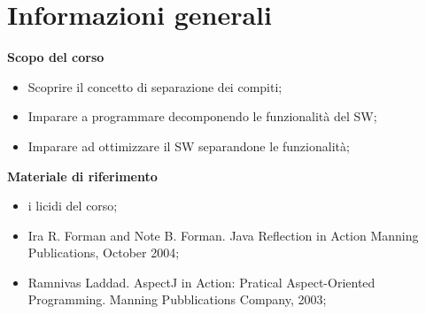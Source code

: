 \section{Informazioni generali}
\textbf{Scopo del corso}
\begin{itemize}
	\item Scoprire il concetto di separazione dei compiti;
	\item Imparare a programmare decomponendo le funzionalità del SW;
	\item Imparare ad ottimizzare il SW separandone le funzionalità;
	\end{itemize}
\textbf{Materiale di riferimento}
\begin{itemize}
	\item i licidi del corso;
	\item Ira R. Forman and Note B. Forman. Java Reflection in Action Manning Publications, October 2004;
	\item Ramnivas Laddad. AspectJ in Action: Pratical Aspect-Oriented Programming. Manning Pubblications Company, 2003;
\end{itemize}
